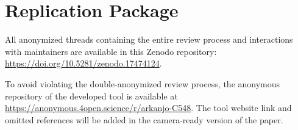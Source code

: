 \documentclass[10pt,conference]{IEEEtran}
\begin{document}
\section*{Replication Package}

All anonymized threads containing the entire review process and interactions with maintainers are available in this Zenodo repository: \href{https://doi.org/10.5281/zenodo.17474124}{https://doi.org/10.5281/zenodo.17474124}.

To avoid violating the double-anonymized review process, the anonymous repository of the developed tool is available at \url{https://anonymous.4open.science/r/arkanjo-C548}. The tool website link and omitted references will be added in the camera-ready version of the paper.

\newpage


\end{document}
